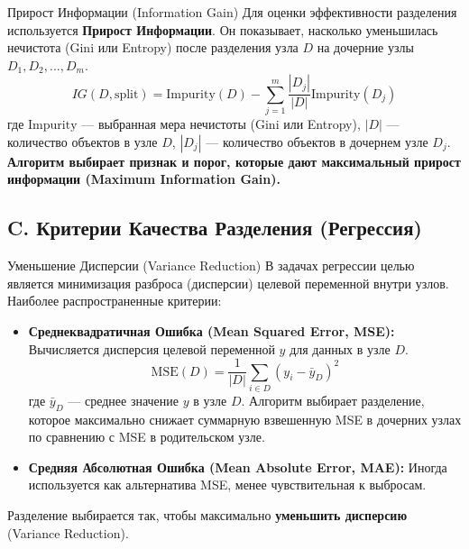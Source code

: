 \begin{myblock}{Прирост Информации (Information Gain)}
    Для оценки эффективности разделения используется \textbf{Прирост Информации}. Он показывает, насколько уменьшилась нечистота (Gini или Entropy) после разделения узла $D$ на дочерние узлы $D_1, D_2, ..., D_m$.
    \[ IG(D, \text{split}) = \text{Impurity}(D) - \sum_{j=1}^{m} \frac{|D_j|}{|D|} \text{Impurity}(D_j) \]
    где $\text{Impurity}$ — выбранная мера нечистоты (Gini или Entropy), $|D|$ — количество объектов в узле $D$, $|D_j|$ — количество объектов в дочернем узле $D_j$.
    \textbf{Алгоритм выбирает признак и порог, которые дают максимальный прирост информации (Maximum Information Gain).}
\end{myblock}

\subsection{C. Критерии Качества Разделения (Регрессия)}
\begin{myblock}{Уменьшение Дисперсии (Variance Reduction)}
    В задачах регрессии целью является минимизация разброса (дисперсии) целевой переменной внутри узлов. Наиболее распространенные критерии:
    \begin{itemize}[nosep, leftmargin=*]
        \item \textbf{Среднеквадратичная Ошибка (Mean Squared Error, MSE):} Вычисляется дисперсия целевой переменной $y$ для данных в узле $D$.
          \[ \text{MSE}(D) = \frac{1}{|D|} \sum_{i \in D} (y_i - \bar{y}_D)^2 \]
          где $\bar{y}_D$ — среднее значение $y$ в узле $D$. Алгоритм выбирает разделение, которое максимально снижает суммарную взвешенную MSE в дочерних узлах по сравнению с MSE в родительском узле.
        \item \textbf{Средняя Абсолютная Ошибка (Mean Absolute Error, MAE):} Иногда используется как альтернатива MSE, менее чувствительная к выбросам.
    \end{itemize}
    Разделение выбирается так, чтобы максимально \textbf{уменьшить дисперсию} (Variance Reduction).
\end{myblock}

